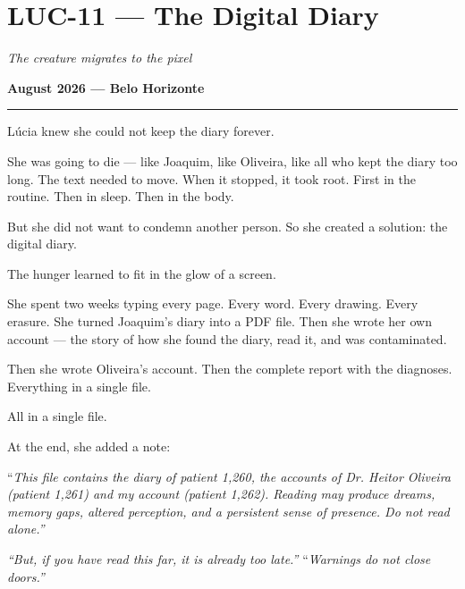 \section*{\textbf{LUC-11} --- The Digital Diary}

\noindent \textit{The creature migrates to the pixel}

\noindent \textbf{August 2026 --- Belo Horizonte}

\vspace{0.5em}\noindent\rule{\textwidth}{0.5pt}\vspace{0.5em}

\noindent Lúcia knew she could not keep the diary forever.

\noindent She was going to die --- like Joaquim, like Oliveira, like all who kept the diary too long. The text needed to move. When it stopped, it took root. First in the routine. Then in sleep. Then in the body.

\noindent But she did not want to condemn another person.
\noindent So she created a solution: the digital diary.

\noindent The hunger learned to fit in the glow of a screen.

\noindent She spent two weeks typing every page. Every word. Every drawing. Every erasure. She turned Joaquim's diary into a PDF file. Then she wrote her own account --- the story of how she found the diary, read it, and was contaminated.

\noindent Then she wrote Oliveira's account. Then the complete report with the diagnoses.
\noindent Everything in a single file.

\noindent All in a single file.

\noindent At the end, she added a note:

\noindent \textquotedblleft{\textit{This file contains the diary of patient 1,260, the accounts of Dr. Heitor Oliveira (patient 1,261) and my account (patient 1,262). Reading may produce dreams, memory gaps, altered perception, and a persistent sense of presence. Do not read alone.\textquotedblright{}}}

\noindent \textit{\textquotedblleft{}But, if you have read this far, it is already too late.\textquotedblright{}}
\noindent \textquotedblleft{\textit{Warnings do not close doors.\textquotedblright{}}}


